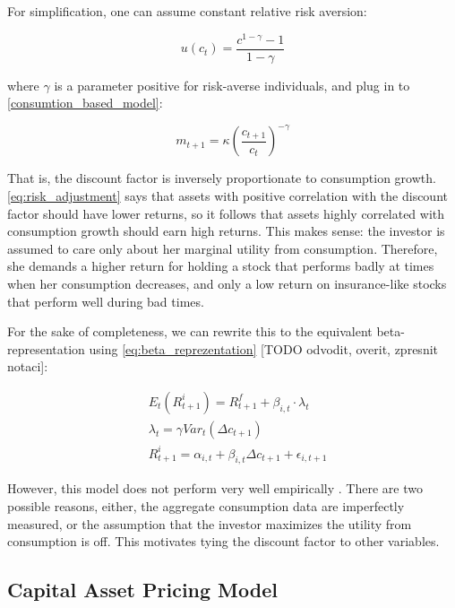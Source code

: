 		 	For simplification, one can assume constant relative risk aversion:
		 	
		 	\begin{equation}
		 		u(c_t) = \frac{c^{1-\gamma}-1}{1-\gamma}
		 	\end{equation}
		 	
		 	where $\gamma$ is a parameter positive for risk-averse individuals, and plug in to \ref{consumtion_based_model}: 
		 	
		 	\begin{equation}
		 	m_{t+1} = \kappa \left(\frac{c_{t+1}}{c_t}\right)^{-\gamma} 
		 	\end{equation}
		 	
		 	 That is, the discount factor is inversely proportionate to consumption growth. \ref{eq:risk_adjustment} says that assets with positive correlation with the discount factor should have lower returns, so it follows that assets highly correlated with consumption growth should earn high returns. This makes sense: the investor is assumed to care only about her marginal utility from consumption. Therefore, she demands a higher return for holding a stock that performs badly at times when her consumption decreases, and only a low return on insurance-like stocks that perform well during bad times.
		 	 
		 	 For the sake of completeness, we can rewrite this to the equivalent beta-representation using \ref{eq:beta_reprezentation} [TODO odvodit, overit, zpresnit notaci]: 
		 	 
		 	 \begin{align}
		 	 & E_t(R_{t+1}^i) = R_{t+1}^f + \beta_{i,t} \cdot \lambda_{t} \\
		 	 & \lambda_{t} = \gamma Var_t(\Delta c_{t+1}) \\
		 	 & R_{t+1}^i = \alpha_{i,t} + \beta_{i,t} \Delta c_{t+1} + \epsilon_{i,t+1}
		 	 \end{align}
		 	 
		 	  However, this model does not perform very well empirically \cite{cochrane1996cross}. There are two possible reasons, either, the aggregate consumption data are imperfectly measured, or the assumption that the investor maximizes the utility from consumption is off. This motivates tying the discount factor to other variables.
	 	
	 	\subsection{Capital Asset Pricing Model}
	 	
